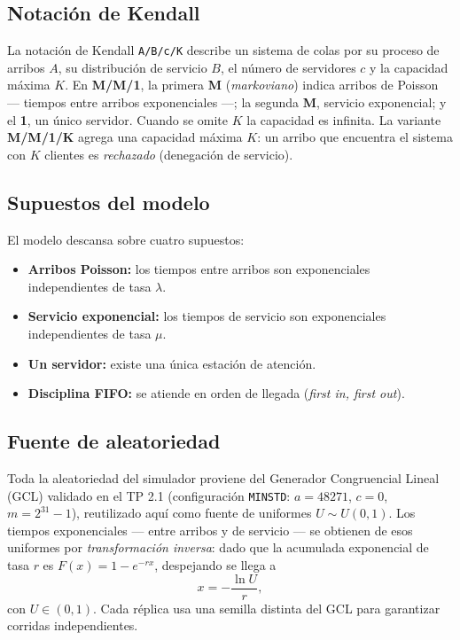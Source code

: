 \documentclass[11pt]{article}
\begin{document}
\subsection{Notaci\'on de Kendall}

La notaci\'on de Kendall \verb|A/B/c/K| describe un sistema de colas por su
proceso de arribos $A$, su distribuci\'on de servicio $B$, el n\'umero de
servidores $c$ y la capacidad m\'axima $K$. En \textbf{M/M/1}, la primera
\textbf{M} (\emph{markoviano}) indica arribos de Poisson --- tiempos entre
arribos exponenciales ---; la segunda \textbf{M}, servicio exponencial; y el
\textbf{1}, un \'unico servidor. Cuando se omite $K$ la capacidad es
infinita. La variante \textbf{M/M/1/K} agrega una capacidad m\'axima $K$:
un arribo que encuentra el sistema con $K$ clientes es \emph{rechazado}
(denegaci\'on de servicio).

\subsection{Supuestos del modelo}

El modelo descansa sobre cuatro supuestos:
\begin{itemize}
  \item \textbf{Arribos Poisson:} los tiempos entre arribos son
    exponenciales independientes de tasa $\lambda$.
  \item \textbf{Servicio exponencial:} los tiempos de servicio son
    exponenciales independientes de tasa $\mu$.
  \item \textbf{Un servidor:} existe una \'unica estaci\'on de atenci\'on.
  \item \textbf{Disciplina FIFO:} se atiende en orden de llegada
    (\emph{first in, first out}).
\end{itemize}

\subsection{Fuente de aleatoriedad}

Toda la aleatoriedad del simulador proviene del Generador Congruencial
Lineal (GCL) validado en el TP 2.1 (configuraci\'on \texttt{MINSTD}:
$a = 48271$, $c = 0$, $m = 2^{31}-1$), reutilizado aqu\'i como fuente de
uniformes $U \sim U(0,1)$. Los tiempos exponenciales --- entre arribos y de
servicio --- se obtienen de esos uniformes por \emph{transformaci\'on
inversa}: dado que la acumulada exponencial de tasa $r$ es
$F(x) = 1 - e^{-rx}$, despejando se llega a
\begin{equation}
x = -\frac{\ln U}{r},
\end{equation}
con $U \in (0,1)$. Cada r\'eplica usa una semilla distinta del GCL para
garantizar corridas independientes.
\end{document}
